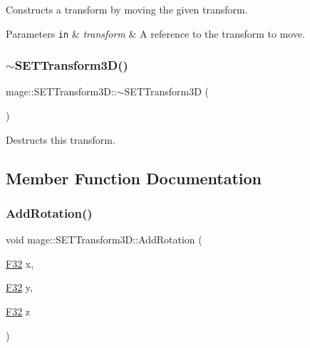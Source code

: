 Constructs a transform by moving the given transform.


\begin{DoxyParams}[1]{Parameters}
\mbox{\tt in}  & {\em transform} & A reference to the transform to move. \\
\hline
\end{DoxyParams}
\mbox{\label{classmage_1_1_s_e_t_transform3_d_a6f9f9d406aab1e2cf80c39288bf1075d}} 
\subsubsection{\texorpdfstring{$\sim$\+S\+E\+T\+Transform3\+D()}{~SETTransform3D()}}
{\footnotesize\ttfamily mage\+::\+S\+E\+T\+Transform3\+D\+::$\sim$\+S\+E\+T\+Transform3D (\begin{DoxyParamCaption}{ }\end{DoxyParamCaption})\hspace{0.3cm}{\ttfamily [default]}}

Destructs this transform. 

\subsection{Member Function Documentation}
\mbox{\label{classmage_1_1_s_e_t_transform3_d_af1eaed8c60010646105cf762d73f8153}} 
\subsubsection{\texorpdfstring{Add\+Rotation()}{AddRotation()}\hspace{0.1cm}{\footnotesize\ttfamily [1/6]}}
{\footnotesize\ttfamily void mage\+::\+S\+E\+T\+Transform3\+D\+::\+Add\+Rotation (\begin{DoxyParamCaption}\item[{\mbox{\hyperlink{namespacemage_aa97e833b45f06d60a0a9c4fc22ae02c0}{F32}}}]{x,  }\item[{\mbox{\hyperlink{namespacemage_aa97e833b45f06d60a0a9c4fc22ae02c0}{F32}}}]{y,  }\item[{\mbox{\hyperlink{namespacemage_aa97e833b45f06d60a0a9c4fc22ae02c0}{F32}}}]{z }\end{DoxyParamCaption})\hspace{0.3cm}{\ttfamily [noexcept]}}

